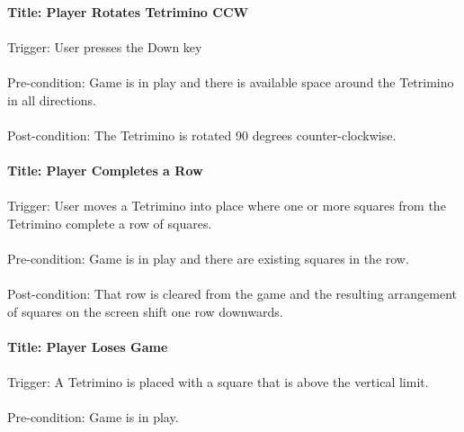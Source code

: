 \documentclass[12pt, titlepage]{article}
\begin{document}
\paragraph{Title: Player Rotates Tetrimino CCW}
\paragraph{}
Trigger: User presses the Down key
\paragraph{}
Pre-condition: Game is in play and there is available space around the Tetrimino in all directions.
\paragraph{}
Post-condition: The Tetrimino is rotated 90 degrees counter-clockwise.

\paragraph{Title: Player Completes a Row}
\paragraph{}
Trigger: User moves a Tetrimino into place where one or more squares from the Tetrimino complete a row of squares.
\paragraph{}
Pre-condition: Game is in play and there are existing squares in the row.
\paragraph{}
Post-condition: That row is cleared from the game and the resulting arrangement of squares on the screen shift one row 
downwards.

\paragraph{Title: Player Loses Game}
\paragraph{}
Trigger: A Tetrimino is placed with a square that is above the vertical limit.
\paragraph{}
Pre-condition: Game is in play.
\end{document}
